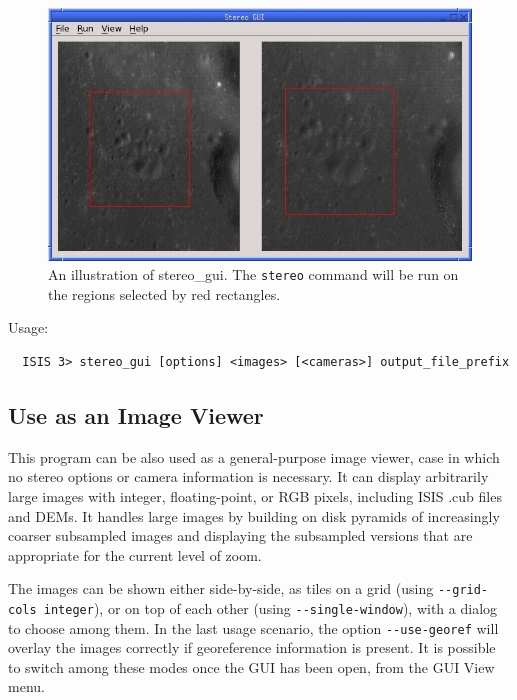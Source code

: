 \begin{figure}[h!]
\begin{center}
\includegraphics[width=5in]{images/stereo_gui.jpg}
\caption[asp\_gui]{An illustration of stereo\_gui. The \texttt{stereo} command
will be run on the regions selected by red rectangles.}
\label{asp_gui_fig}
\end{center}
\end{figure}

Usage:
\begin{verbatim}
  ISIS 3> stereo_gui [options] <images> [<cameras>] output_file_prefix
\end{verbatim}

\subsection{Use as an Image Viewer}

This program can be also used as a general-purpose image viewer, case in
which no stereo options or camera information is necessary.  It can
display arbitrarily large images with integer, floating-point, or RGB
pixels, including ISIS .cub files and DEMs. It handles large images by
building on disk pyramids of increasingly coarser subsampled images and
displaying the subsampled versions that are appropriate for the current
level of zoom.

The images can be shown either side-by-side, as tiles on a grid (using
\texttt{-\/-grid-cols integer}), or on top of each other (using
\texttt{-\/-single-window}), with a dialog to choose among them.  In the
last usage scenario, the option \texttt{-\/-use-georef} will overlay the
images correctly if georeference information is present.  It is possible
to switch among these modes once the GUI has been open, from the GUI
View menu.

